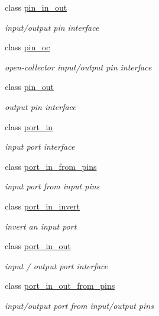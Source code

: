 \begin{DoxyCompactItemize}
class \hyperlink{classhwlib_1_1pin__in__out}{pin\+\_\+in\+\_\+out}
\begin{DoxyCompactList}\small\item\em input/output pin interface \end{DoxyCompactList}\item 
class \hyperlink{classhwlib_1_1pin__oc}{pin\+\_\+oc}
\begin{DoxyCompactList}\small\item\em open-\/collector input/output pin interface \end{DoxyCompactList}\item 
class \hyperlink{classhwlib_1_1pin__out}{pin\+\_\+out}
\begin{DoxyCompactList}\small\item\em output pin interface \end{DoxyCompactList}\item 
class \hyperlink{classhwlib_1_1port__in}{port\+\_\+in}
\begin{DoxyCompactList}\small\item\em input port interface \end{DoxyCompactList}\item 
class \hyperlink{classhwlib_1_1port__in__from__pins}{port\+\_\+in\+\_\+from\+\_\+pins}
\begin{DoxyCompactList}\small\item\em input port from input pins \end{DoxyCompactList}\item 
class \hyperlink{classhwlib_1_1port__in__invert}{port\+\_\+in\+\_\+invert}
\begin{DoxyCompactList}\small\item\em invert an input port \end{DoxyCompactList}\item 
class \hyperlink{classhwlib_1_1port__in__out}{port\+\_\+in\+\_\+out}
\begin{DoxyCompactList}\small\item\em input / output port interface \end{DoxyCompactList}\item 
class \hyperlink{classhwlib_1_1port__in__out__from__pins}{port\+\_\+in\+\_\+out\+\_\+from\+\_\+pins}
\begin{DoxyCompactList}\small\item\em input/output port from input/output pins \end{DoxyCompactList}\item 

\end{DoxyCompactItemize}
